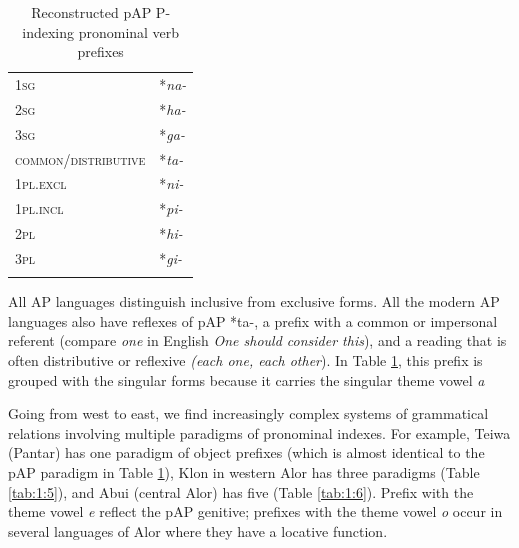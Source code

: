 \begin{table}\centering


\begin{tabular}{ll}
\mytoprule
{\scshape 1sg} & *\textit{na-}\\
{\scshape 2sg} & *\textit{ha-}\\
{\scshape 3sg} & *\textit{ga-}\\
{\scshape common/distributive} & *\textit{ta-}\\
{\scshape 1pl.excl} & *\textit{ni-}  \\
{\scshape 1pl.incl} & *\textit{pi-}\\
{\scshape 2pl} & *\textit{hi-}\\
{\scshape 3pl} & *\textit{gi-}\\
\mybottomrule
\end{tabular}
\caption{Reconstructed pAP P-indexing pronominal verb prefixes }
\label{tab:1:4}
\end{table}

All AP languages distinguish inclusive from exclusive forms. All the modern AP languages also have reflexes of pAP *ta-, a prefix with a common or impersonal referent (compare \textit{one} in English \textit{One should consider this}), and a reading that is often distributive or reflexive \textit{(each one, each other}). In Table \ref{tab:1:4}, this prefix is grouped with the singular forms because it carries the singular theme vowel \textit{a}

Going from west to east, we find increasingly complex systems of grammatical relations involving multiple paradigms of pronominal indexes. For example, Teiwa (Pantar) has one paradigm of object prefixes (which is almost identical to the pAP paradigm in Table \ref{tab:1:4}), Klon in western Alor has three paradigms (Table \ref{tab:1:5}), and Abui (central Alor) has five (Table \ref{tab:1:6}). Prefix with the theme vowel \textit{e} reflect the pAP genitive;  prefixes with the theme vowel \textit{o} occur in several languages of Alor where they have a locative function.



